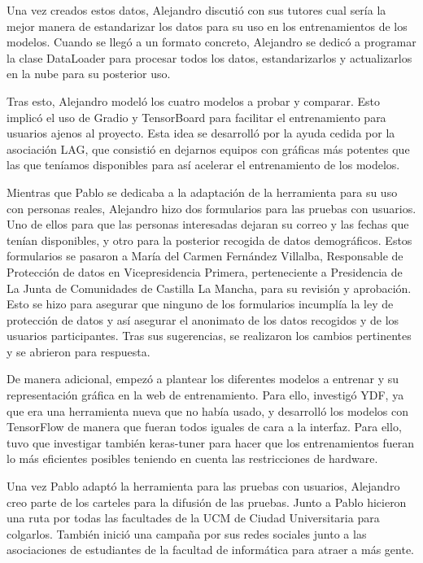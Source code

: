 Una vez creados estos datos, Alejandro discutió con sus tutores cual sería la mejor manera de estandarizar los datos para su uso en los entrenamientos de los modelos. Cuando se llegó a un formato concreto, Alejandro se dedicó a programar la clase DataLoader para procesar todos los datos, estandarizarlos y actualizarlos en la nube para su posterior uso.

Tras esto, Alejandro modeló los cuatro modelos a probar y comparar. Esto implicó el uso de Gradio y TensorBoard para facilitar el entrenamiento para usuarios ajenos al proyecto. Esta idea se desarrolló por la ayuda cedida por la asociación LAG, que consistió en dejarnos equipos con gráficas más potentes que las que teníamos disponibles para así acelerar el entrenamiento de los modelos.

Mientras que Pablo se dedicaba a la adaptación de la herramienta para su uso con personas reales, Alejandro hizo dos formularios para las pruebas con usuarios. Uno de ellos para que las personas interesadas dejaran su correo y las fechas que tenían disponibles, y otro para la posterior recogida de datos demográficos. Estos formularios se pasaron a María del Carmen Fernández Villalba, Responsable de Protección de datos en Vicepresidencia Primera, perteneciente a Presidencia de La Junta de Comunidades de Castilla La Mancha, para su revisión y aprobación.
Esto se hizo para asegurar que ninguno de los formularios incumplía la ley de protección de datos y así asegurar el anonimato de los datos recogidos y de los usuarios participantes. Tras sus sugerencias, se realizaron los cambios pertinentes y se abrieron para respuesta.

De manera adicional, empezó a plantear los diferentes modelos a entrenar y su representación gráfica en la web de entrenamiento. Para ello, investigó YDF, ya que era una herramienta nueva que no había usado, y desarrolló los modelos con TensorFlow de manera que fueran todos iguales de cara a la interfaz. Para ello, tuvo que investigar también keras-tuner para hacer que los entrenamientos fueran lo más eficientes posibles teniendo en cuenta las restricciones de hardware.

Una vez Pablo adaptó la herramienta para las pruebas con usuarios, Alejandro creo parte de los carteles para la difusión de las pruebas. Junto a Pablo hicieron una ruta por todas las facultades de la UCM de Ciudad Universitaria para colgarlos. También inició una campaña por sus redes sociales junto a las asociaciones de estudiantes de la facultad de informática para atraer a más gente.

